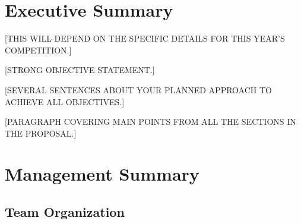 \documentclass[proposal]{byu-aero}
\begin{document}

\section{Executive Summary} %
\label{sec:ExecutiveSummary}

{\color{BYUred}[THIS WILL DEPEND ON THE SPECIFIC DETAILS FOR THIS YEAR'S COMPETITION.]}

{\color{BYUred}[STRONG OBJECTIVE STATEMENT.]}

{\color{BYUred}[SEVERAL SENTENCES ABOUT YOUR PLANNED APPROACH TO ACHIEVE ALL OBJECTIVES.]}
\lipsum[2]

{\color{BYUred}[PARAGRAPH COVERING MAIN POINTS FROM ALL THE SECTIONS IN THE PROPOSAL.]}
\lipsum[2]





\section{Management Summary} %
\label{sec:ManagementSummary}



\subsection{Team Organization}
\label{ssec:TeamOrganization}
\end{document}

